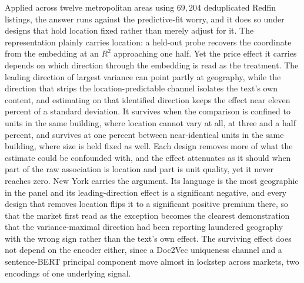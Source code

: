 \documentclass{article}
\begin{document}
Applied across twelve metropolitan areas using $69{,}204$ deduplicated Redfin listings, the answer runs against the predictive-fit worry, and it does so under designs that hold location fixed rather than merely adjust for it. The representation plainly carries location: a held-out probe recovers the coordinate from the embedding at an $R^2$ approaching one half. Yet the price effect it carries depends on which direction through the embedding is read as the treatment. The leading direction of largest variance can point partly at geography, while the direction that strips the location-predictable channel isolates the text's own content, and estimating on that identified direction keeps the effect near eleven percent of a standard deviation. It survives when the comparison is confined to units in the same building, where location cannot vary at all, at three and a half percent, and survives at one percent between near-identical units in the same building, where size is held fixed as well. Each design removes more of what the estimate could be confounded with, and the effect attenuates as it should when part of the raw association is location and part is unit quality, yet it never reaches zero. New York carries the argument. Its language is the most geographic in the panel and its leading-direction effect is a significant negative, and every design that removes location flips it to a significant positive premium there, so that the market first read as the exception becomes the clearest demonstration that the variance-maximal direction had been reporting laundered geography with the wrong sign rather than the text's own effect. The surviving effect does not depend on the encoder either, since a Doc2Vec uniqueness channel and a sentence-BERT principal component move almost in lockstep across markets, two encodings of one underlying signal.
\end{document}
